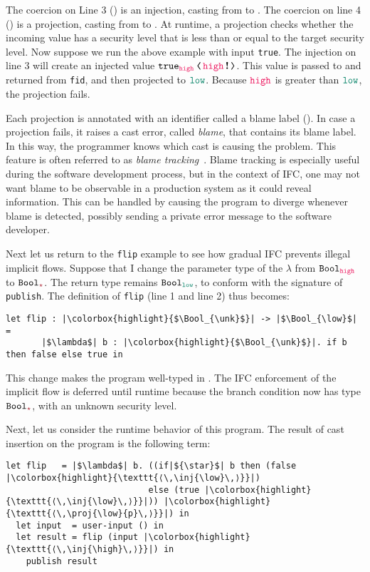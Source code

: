 The coercion on Line 3 (\inj{\high}) is an injection, casting from \high to
\unk.
%
The coercion on line 4 () is a projection, casting from \unk to
\low.
%
At runtime, a projection checks whether the incoming value has a security level
that is less than or equal to the target security level.
%
Now suppose we run the above example with input \texttt{true}. The injection on
line 3 will create an injected value $\cccast{\true_{\high}}{\inj{\high}}$. This
value is passed to and returned from \texttt{fid}, and then projected to $\low$.
Because $\high$ is greater than $\low$, the projection fails.

Each projection is annotated with an identifier called a blame label
().  In case a projection fails, it raises a cast error,
called \textit{blame}, that contains its blame label. In this way, the
programmer knows which cast is causing the problem.  This feature is
often referred to as
\textit{blame tracking}~\parencite{Findler:2002eu,Wadler:2009qv}.
Blame tracking is especially useful during the software development
process, but in the context of IFC, one may not want blame to be
observable in a production system as it could reveal information.
This can be handled by causing the program to diverge whenever blame
is detected, possibly sending a private error message to the software
developer.

Next let us return to the \texttt{flip} example to see how gradual IFC prevents
illegal implicit flows. Suppose that I change the parameter type of the
$\lambda$ from $\Bool_{\high}$ to $\Bool_{\unk}$. The return type remains
$\Bool_{\low}$, to conform with the signature of \texttt{publish}. The
definition of \texttt{flip} (line 1 and line 2) thus becomes:

\begin{lstlisting}[style=tt]
  let flip : |\colorbox{highlight}{$\Bool_{\unk}$}| -> |$\Bool_{\low}$| =
       |$\lambda$| b : |\colorbox{highlight}{$\Bool_{\unk}$}|. if b then false else true in
\end{lstlisting}

\noindent This change makes the program well-typed in \Surface. The IFC
enforcement of the implicit flow is deferred until runtime because the branch
condition now has type $\Bool_{\unk}$, with an unknown security level.

Next, let us consider the runtime behavior of this program. The result of cast
insertion on the \Surface program is the following \CC term:

\begin{lstlisting}[style=tt]
  let flip   = |$\lambda$| b. ((if|${\star}$| b then (false |\colorbox{highlight}{\texttt{⟨\,\inj{\low}\,⟩}}|)
                            else (true |\colorbox{highlight}{\texttt{⟨\,\inj{\low}\,⟩}}|)) |\colorbox{highlight}{\texttt{⟨\,\proj{\low}{p}\,⟩}}|) in
  let input  = user-input () in
  let result = flip (input |\colorbox{highlight}{\texttt{⟨\,\inj{\high}\,⟩}}|) in
    publish result
\end{lstlisting}

